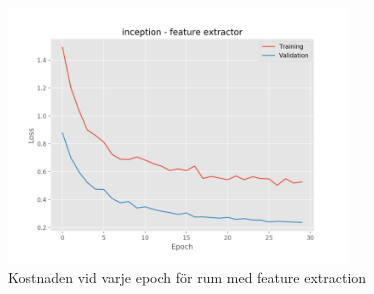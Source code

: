 \documentclass[]{kththesis}
\begin{document}
\begin{figure}[h]
    \includegraphics[width=9cm]{r_l_inception_fe}
    \caption{Kostnaden vid varje epoch för rum med feature extraction}
    \label{fig:r_l_1}
  \end{figure}
  
\end{document}
